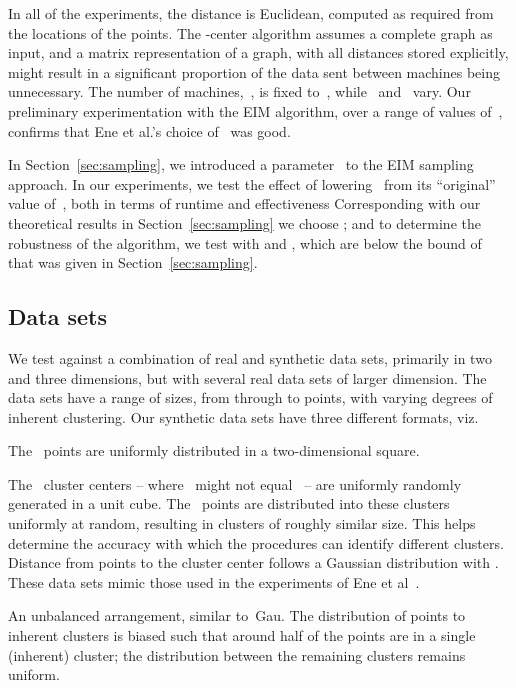 \documentclass[11pt]{article}
\newcommand{\ene}{{\sc EIM}\xspace}
\newcommand{\unif}{{\sc Unif}\xspace}
\newcommand{\gauss}{{\sc Gau}\xspace}
\newcommand{\unbalanced}{{\sc UnB}\xspace}
\begin{document}
In all of the experiments, the distance is Euclidean, computed as required
from the locations of the points.
The -center algorithm assumes a complete graph as input, and a matrix
representation of a graph, with all distances stored explicitly,
might result in a significant proportion of the data sent between machines being unnecessary.
The number of machines,~, is fixed to~, while~ and~ vary.
Our preliminary experimentation with the \ene algorithm, over a range of values of~,
confirms that Ene et al.'s choice of~ was good.



In Section~\ref{sec:sampling}, we introduced a parameter~ to the \ene sampling
approach.
In our experiments, we test the effect of lowering~ from its
``original'' value of~, both in terms of runtime and effectiveness
Corresponding with our theoretical results in Section~\ref{sec:sampling} we
choose ; and to determine the robustness of the algorithm, we test
with  and , which are below the bound of  that was given in Section~\ref{sec:sampling}.




\subsection{Data sets}

We test against a combination of real and synthetic data sets,
primarily in two and three dimensions,
but with several real data sets of larger dimension.
The data sets have a range of sizes, from  through to
 points, with varying degrees of inherent clustering.
Our synthetic  data sets have three different formats, viz.


\begin{description}
\setlength\itemsep{0.5em}
\item[\unif] The~ points are uniformly distributed in a two-dimensional square.
\item[\gauss] 
The~ cluster centers -- where~ might not equal~ -- are uniformly randomly generated in a unit cube.
The~ points are distributed into these clusters uniformly at random, resulting in clusters of roughly similar size.
This helps determine the accuracy with which the procedures can
identify different clusters.
Distance from points to the cluster center follows a Gaussian distribution with
.
These data sets mimic those used in the experiments of Ene et al~\cite{ene2011fast}.
\item[\unbalanced]
An unbalanced arrangement, similar to~\gauss.
The distribution of points to inherent clusters is biased
such that around half of the points are in a single
(inherent) cluster; the distribution between the remaining clusters remains uniform.
\end{description}
\end{document}
